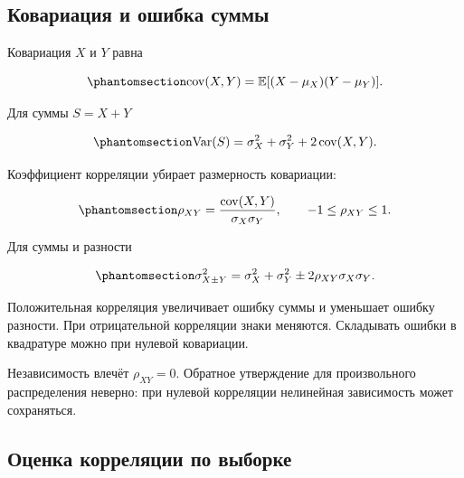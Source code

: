 \documentclass[
  russian,
  11pt,
  a4paper,
  open=any]{scrbook}
\begin{document}
\subsection{Ковариация и ошибка
суммы}\label{ux43aux43eux432ux430ux440ux438ux430ux446ux438ux44f-ux438-ux43eux448ux438ux431ux43aux430-ux441ux443ux43cux43cux44b}

Ковариация \(X\) и \(Y\) равна

\begin{equation}\protect\phantomsection\label{eq-ch6-covariance-definition}{
\operatorname{cov}(X,Y)
=\mathbb E[(X-\mu_X)(Y-\mu_Y)].
}\end{equation}

Для суммы \(S=X+Y\)

\begin{equation}\protect\phantomsection\label{eq-ch6-sum-variance-with-covariance}{
\operatorname{Var}(S)
=\sigma_X^2+\sigma_Y^2
+2\operatorname{cov}(X,Y).
}\end{equation}

Коэффициент корреляции убирает размерность ковариации:

\begin{equation}\protect\phantomsection\label{eq-ch6-correlation-coefficient}{
\rho_{XY}
=\frac{\operatorname{cov}(X,Y)}{\sigma_X\sigma_Y},
\qquad
-1\le\rho_{XY}\le1.
}\end{equation}

Для суммы и разности

\begin{equation}\protect\phantomsection\label{eq-ch6-sum-difference-uncertainty}{
\sigma_{X\pm Y}^2
=\sigma_X^2+\sigma_Y^2
\pm2\rho_{XY}\sigma_X\sigma_Y.
}\end{equation}

Положительная корреляция увеличивает ошибку суммы и уменьшает ошибку
разности. При отрицательной корреляции знаки меняются. Складывать ошибки
в квадратуре можно при нулевой ковариации.

Независимость влечёт \(\rho_{XY}=0\). Обратное утверждение для
произвольного распределения неверно: при нулевой корреляции нелинейная
зависимость может сохраняться.

\subsection{Оценка корреляции по
выборке}\label{ux43eux446ux435ux43dux43aux430-ux43aux43eux440ux440ux435ux43bux44fux446ux438ux438-ux43fux43e-ux432ux44bux431ux43eux440ux43aux435}
\end{document}
